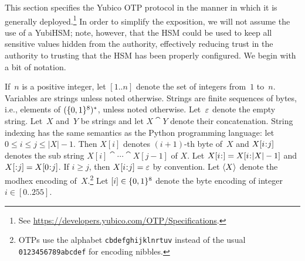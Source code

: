 \label{sec:otp}
%
This section specifies the Yubico OTP protocol in the manner in which it is
generally deployed.\footnote{See
\url{https://developers.yubico.com/OTP/Specifications}.}
%
In order to simplify the exposition, we will not assume the use of a YubiHSM;
note, however, that the HSM could be used to keep all sensitive values hidden from
the authority, effectively reducing trust in the authority to trusting that the
HSM has been properly configured.
%
We begin with a bit of notation.

If~$n$ is a positive integer, let $[1..n]$ denote the set of integers from~$1$ to~$n$.
%
Variables are strings unless noted otherwise.
%
Strings are finite sequences of bytes, i.e., elements of $(\{0,1\}^8)^*$, unless
noted otherwise. Let~$\varepsilon$ denote the empty string.
%
Let~$X$ and~$Y$ be strings and let $X \cat Y$ denote their concatenation.
%
String indexing has the same semantics as the Python programming language: let
$0 \leq i \leq j \leq |X|-1$. Then $X[i]$ denotes $(i+1)$-th byte of~$X$ and
$\substr(X,i,j)$ denotes the sub string $X[i] \cat \cdots \cat X[j-1]$ of $X$.
Let $\substr(X,i,) = \substr(X,i,|X|-1)$ and $\substr(X,,j) = \substr(X,0,j)$.
%
If $i \geq j$, then $\substr(X,i,j) = \emptystr$ by convention.
%
Let $\str(X)$ denote the modhex encoding of~$X$.\footnote{OTPs
use the alphabet \texttt{cbdefghijklnrtuv} instead of the usual
\texttt{0123456789abcdef} for encoding nibbles.}
%
Let $\byte(i) \in \bits^8$ denote the byte encoding of integer $i\in[0..255]$.

